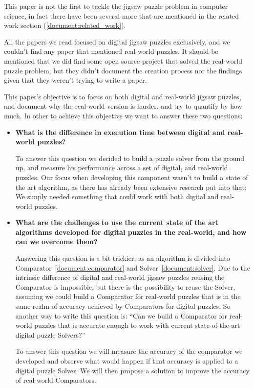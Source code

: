 \documentclass{article}
\begin{document}
This paper is not the first to tackle the jigsaw puzzle problem in computer science,
in fact there have been several more that are mentioned in the related work section (\cref{document:related_work}).

All the papers we read focused on digital jigsaw puzzles exclusively,
and we couldn't find any paper that mentioned real-world puzzles.
It should be mentioned that we did find some open source project that solved the
real-world puzzle problem, but they didn’t document the creation process nor the
findings given that they weren't trying to write a paper.

This paper’s objective is to focus on both digital and real-world jigsaw puzzles,
and document why the real-world version is harder, and try to quantify by how much.
In other to achieve this objective we want to answer these two questions:
\begin{itemize}
  \item \textbf{What is the difference in execution time between
                digital and real-world puzzles?}
  
  To answer this question we decided to build a puzzle solver from the ground up,
  and measure his performance across a set of digital, and real-world puzzles.
  Our focus when developing this component wasn't to build a state of the art algorithm,
  as there has already been extensive research put into that;
  We simply needed something that could work with both digital and real-world puzzles.
  
  \item \textbf{What are the challenges to use the current state of the art algorithms developed for digital
                puzzles in the real-world, and how can we overcome them?}
  
	Answering this question is a bit trickier, as an algorithm is divided into Comparator~\cref{document:comparator}
  and Solver~\cref{document:solver}. Due to the intrinsic difference of digital and real-world jigsaw puzzles
  reusing the Comparator is impossible, but there is the possibility to reuse the Solver,
  assuming we could build a Comparator for real-world puzzles that is in the same realm
  of accuracy achieved by Comparators for digital puzzles.
  So another way to write this question is: ``Can we build a Comparator for real-world
  puzzles that is accurate enough to work with current state-of-the-art  digital
  puzzle Solvers?''

	To answer this question we will measure the accuracy of the comparator we developed
  and observe what would happen if that accuracy is
  applied to a digital puzzle Solver. We will then propose a solution to improve
  the accuracy of real-world Comparators.


\end{itemize}
\end{document}
